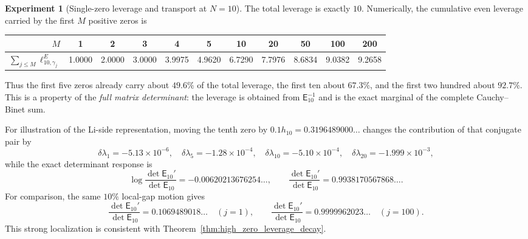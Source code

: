 \documentclass[11pt]{amsart}
\numberwithin{equation}{section}
\theoremstyle{plain}
\theoremstyle{definition}
\newtheorem{experiment}[theorem]{Experiment}
\theoremstyle{remark}
\newcommand{\E}{\mathsf E}
\begin{document}
\begin{experiment}[Single-zero leverage and transport at $N=10$]
The total leverage is exactly $10$.  Numerically, the cumulative even leverage carried by the first $M$ positive zeros is
\begin{center}
\small
\begin{tabular}{rcccccccccc}
\toprule
$M$&1&2&3&4&5&10&20&50&100&200\\
\midrule
$\sum_{j\le M}\ell_{10,\gamma_j}^E$
&1.0000&2.0000&3.0000&3.9975&4.9620&6.7290&7.7976&8.6834&9.0382&9.2658\\
\bottomrule
\end{tabular}
\end{center}
Thus the first five zeros already carry about $49.6\%$ of the total leverage, the first ten about $67.3\%$, and the first two hundred about $92.7\%$.  This is a property of the \emph{full matrix determinant}: the leverage is obtained from $\E_{10}^{-1}$ and is the exact marginal of the complete Cauchy--Binet sum.

For illustration of the Li-side representation, moving the tenth zero by $0.1h_{10}=0.3196489000\ldots$ changes the contribution of that conjugate pair by
\begin{equation}
\delta\lambda_1=-5.13\times10^{-6},\quad
\delta\lambda_5=-1.28\times10^{-4},\quad
\delta\lambda_{10}=-5.10\times10^{-4},\quad
\delta\lambda_{20}=-1.999\times10^{-3},
\end{equation}
while the exact determinant response is
\begin{equation}
\log\frac{\det\E_{10}'}{\det\E_{10}}
=-0.00620213676254\ldots,
\qquad
\frac{\det\E_{10}'}{\det\E_{10}}
=0.9938170567868\ldots .
\label{eq:N10_tenth_zero_response}
\end{equation}
For comparison, the same $10\%$ local-gap motion gives
\begin{equation}
\frac{\det\E_{10}' }{\det\E_{10}}=0.1069489018\ldots\quad (j=1),
\qquad
\frac{\det\E_{10}' }{\det\E_{10}}=0.9999962023\ldots\quad (j=100).
\end{equation}
This strong localization is consistent with Theorem~\ref{thm:high_zero_leverage_decay}.
\end{experiment}
\end{document}
